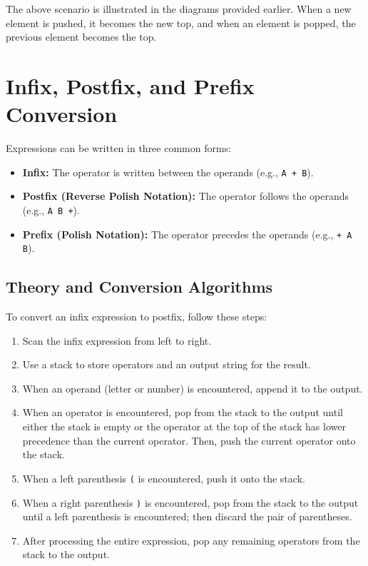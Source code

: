 The above scenario is illustrated in the diagrams provided earlier. When a new element is pushed, it becomes the new top, and when an element is popped, the previous element becomes the top.

\section{Infix, Postfix, and Prefix Conversion}

Expressions can be written in three common forms:
\begin{itemize}
    \item \textbf{Infix:} The operator is written between the operands (e.g., \texttt{A + B}).
    \item \textbf{Postfix (Reverse Polish Notation):} The operator follows the operands (e.g., \texttt{A B +}).
    \item \textbf{Prefix (Polish Notation):} The operator precedes the operands (e.g., \texttt{+ A B}).
\end{itemize}

\subsection{Theory and Conversion Algorithms}
To convert an infix expression to postfix, follow these steps:
\begin{enumerate}
    \item Scan the infix expression from left to right.
    \item Use a stack to store operators and an output string for the result.
    \item When an operand (letter or number) is encountered, append it to the output.
    \item When an operator is encountered, pop from the stack to the output until either the stack is empty or the operator at the top of the stack has lower precedence than the current operator. Then, push the current operator onto the stack.
    \item When a left parenthesis \texttt{(} is encountered, push it onto the stack.
    \item When a right parenthesis \texttt{)} is encountered, pop from the stack to the output until a left parenthesis is encountered; then discard the pair of parentheses.
    \item After processing the entire expression, pop any remaining operators from the stack to the output.
\end{enumerate}

